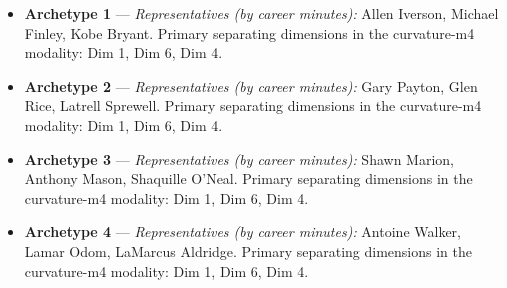 \begin{itemize}
\item \textbf{Archetype 1} --- \emph{Representatives (by career minutes):} Allen Iverson, Michael Finley, Kobe Bryant. Primary separating dimensions in the curvature-m4 modality: Dim 1, Dim 6, Dim 4.
\item \textbf{Archetype 2} --- \emph{Representatives (by career minutes):} Gary Payton, Glen Rice, Latrell Sprewell. Primary separating dimensions in the curvature-m4 modality: Dim 1, Dim 6, Dim 4.
\item \textbf{Archetype 3} --- \emph{Representatives (by career minutes):} Shawn Marion, Anthony Mason, Shaquille O'Neal. Primary separating dimensions in the curvature-m4 modality: Dim 1, Dim 6, Dim 4.
\item \textbf{Archetype 4} --- \emph{Representatives (by career minutes):} Antoine Walker, Lamar Odom, LaMarcus Aldridge. Primary separating dimensions in the curvature-m4 modality: Dim 1, Dim 6, Dim 4.
\end{itemize}
